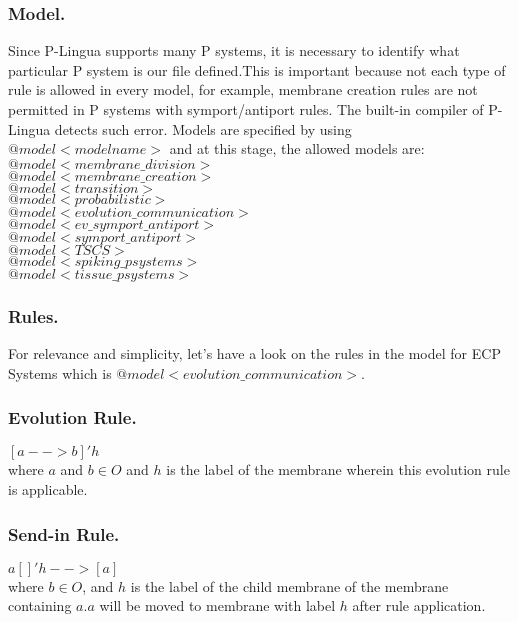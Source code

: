 \documentclass{acm_proc_article-sp}
\begin{document}
       \subsubsection{Model.}
        \indent  Since P-Lingua supports many P systems, it is necessary to identify what particular P system is our file defined.This is important because not each type of rule is allowed in every model, for example, membrane creation rules are not permitted in P systems with symport/antiport rules. The built-in compiler of P-Lingua detects such error. Models
are specified by using $@model<model name>$ and at this stage, the allowed
models are:\\
$@model<membrane\_division> $\\
$@model<membrane\_creation>$\\
$@model<transition>$\\
$@model<probabilistic>$\\
$@model<evolution\_communication>$\\
$@model<ev\_symport\_antiport>$\\
$@model<symport\_antiport>$\\
$@model<TSCS>$\\
$@model<spiking\_psystems>$\\
$@model<tissue\_psystems>$
 
	\subsubsection{ Rules.} For relevance and simplicity, let's have a look on the rules in the model for ECP Systems which is $ @model<evolution\_communication>$. \\
        \subsubsection*{Evolution Rule.}
        
\indent     $[a --> b]'h$ \\where $a$ and $b \in O$ and $h$ is the label of the membrane wherein this evolution rule is applicable.
     \subsubsection*{Send-in Rule.}
        
\indent     $a[]'h-->[a]$ \\where $b \in O$, and $h$ is the label of the child membrane of the membrane containing $a$.$a$ will be moved to membrane with label $h$ after rule application.
\end{document}
